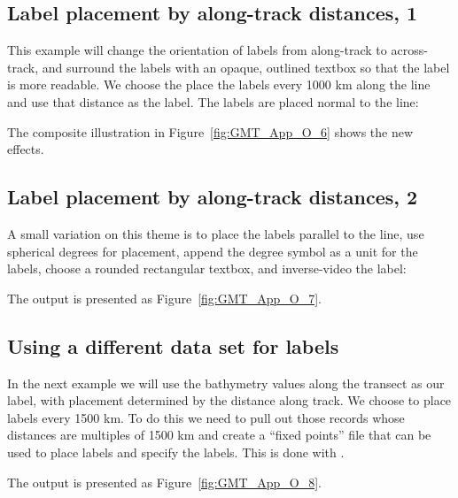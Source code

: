 \subsection{Label placement by along-track distances, 1}

This example will change the orientation of labels from along-track to across-track, and
surround the labels with an opaque, outlined textbox so that the label is more readable.  We choose
the place the labels every 1000 km along the line and use that distance as the label.  The
labels are placed normal to the line:




\noindent
The composite illustration in Figure~\ref{fig:GMT_App_O_6} shows the new effects.

\subsection{Label placement by along-track distances, 2}

A small variation on this theme is to place the labels parallel to the line, use
spherical degrees for placement, append the degree symbol as a unit for the
labels, choose a rounded rectangular textbox, and inverse-video the label:



\noindent
The output is presented as Figure~\ref{fig:GMT_App_O_7}.


\subsection{Using a different data set for labels}

In the next example we will use the bathymetry values along the transect as
our label, with placement determined by the distance along track.  We choose
to place labels every 1500 km.  To do this we need to pull out those records
whose distances are multiples of 1500 km and create a ``fixed points'' file
that can be used to place labels and specify the labels.  This is done with
.



\noindent
The output is presented as Figure~\ref{fig:GMT_App_O_8}.

